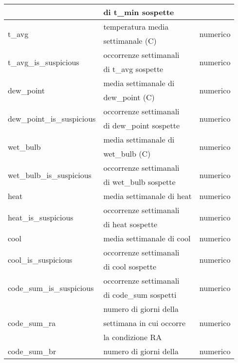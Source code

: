 \begin{longtable}{lll}
	& di t\_min sospette &  \\ \hline		
	\multirow{2}{*}{t\_avg}		& temperatura media  	  & 
	\multirow{2}{*}{numerico}	\\ 
	& settimanale (\degree C) &	\\\hline
	\multirow{2}{*}{t\_avg\_is\_suspicious}	& occorrenze settimanali & 
	\multirow{2}{*}{numerico}	\\ 
	& di t\_avg sospette & \\	\hline		
	\multirow{2}{*}{dew\_point}	& media settimanale di  	 & 	
	\multirow{2}{*}{numerico}	   	\\ 
	& dew\_point (\degree C) &		\\ \hline
	\multirow{2}{*}{dew\_point\_is\_suspicious}		& occorrenze settimanali & 
	\multirow{2}{*}{numerico}	\\
	& di dew\_point sospette &  \\	\hline
	\multirow{2}{*}{wet\_bulb}	& media settimanale di & 	
	\multirow{2}{*}{numerico}	   	\\ 
	& wet\_bulb (\degree C)&\\ \hline
	\multirow{2}{*}{wet\_bulb\_is\_suspicious}		& occorrenze settimanali & 
	\multirow{2}{*}{numerico}	\\ 
	& di wet\_bulb sospette & \\	\hline
	heat	& media settimanale di heat & 	numerico \\	\hline
	\multirow{2}{*}{heat\_is\_suspicious} & occorrenze settimanali & 
	\multirow{2}{*}{numerico}	\\
	& di heat sospette &	\\	\hline		
	cool	& media settimanale di cool & numerico \\	\hline
	\multirow{2}{*}{cool\_is\_suspicious}		& occorrenze settimanali & 
	\multirow{2}{*}{numerico}	\\
	& di cool sospette & \\	\hline		 
	\multirow{2}{*}{code\_sum\_is\_suspicious}	& occorrenze settimanali & 
	\multirow{2}{*}{numerico}	\\
	& di code\_sum sospetti & 	 \\\hline	
	\multirow{3}{*}{code\_sum\_ra}	& numero di giorni della 	& 	 
	\multirow{3}{*}{numerico} \\
	& settimana in cui occorre & \\ 
	& la condizione RA & \\ \hline
	\multirow{3}{*}{code\_sum\_br}	& numero di giorni della	 & 	 
	\multirow{3}{*}{numerico} \\

\end{longtable}
